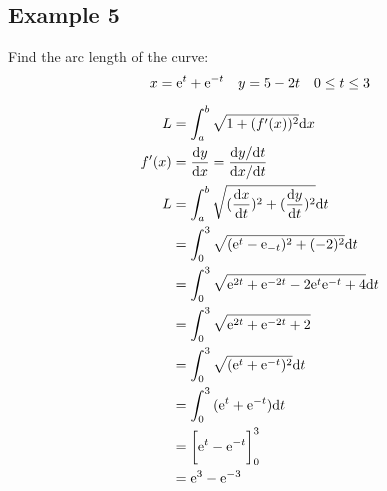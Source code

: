 \documentclass[letterpaper, 12pt]{math}
\begin{document}
\subsection*{Example 5}
Find the arc length of the curve:
\[ x = \mathrm{e}^{t}+\mathrm{e}^{-t} \quad y = 5-2t \quad 0 \leq t \leq 3 \]
\begin{center}
\end{center}
\begin{align*}
  L &= \int_{a}^{b}{\sqrt{1+(f'(x))^{2}}\mathrm{d}{x}} \\
  f'(x) &= \frac{\mathrm{d}{y}}{\mathrm{d}{x}} =
    \frac{\mathrm{d}{y}/\mathrm{d}{t}}{\mathrm{d}{x}/\mathrm{d}{t}} \\
  L &= \int_{a}^{b}{\sqrt{(\frac{\mathrm{d}{x}}{\mathrm{d}{t}})^{2}+
      (\frac{\mathrm{d}{y}}{\mathrm{d}{t}})^{2}}\mathrm{d}{t}} \\
  &= \int_{0}^{3}{\sqrt{(\mathrm{e}^{t}-\mathrm{e}_{-t})^{2}+(-2)^{2}}\mathrm{d}{t}} \\
  &= \int_{0}^{3}{\sqrt{\mathrm{e}^{2t}+\mathrm{e}^{-2t}-2\mathrm{e}^{t}\mathrm{e}^{-t}+4}\mathrm{d}{t}} \\
  &= \int_{0}^{3}{\sqrt{\mathrm{e}^{2t}+\mathrm{e}^{-2t}+2}} \\
  &= \int_{0}^{3}{\sqrt{(\mathrm{e}^{t}+\mathrm{e}^{-t})^{2}}\mathrm{d}{t}} \\
  &= \int_{0}^{3}{(\mathrm{e}^{t}+\mathrm{e}^{-t})\mathrm{d}{t}} \\
  &= \bigg[\mathrm{e}^{t}-\mathrm{e}^{-t}\bigg]_{0}^{3} \\
  &= \mathrm{e}^{3}-\mathrm{e}^{-3}
\end{align*}
\end{document}
